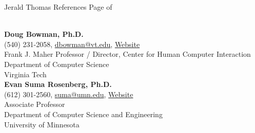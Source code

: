 



\newpage

\setcounter{page}{1}
\makecvfooter
  {Jerald Thomas}
  {References}
  {Page \thepage \hspace{1pt} of \pageref{references_last}}


\makecvheader[C]
\singlespacing

\\

\textbf{Doug Bowman, Ph.D.}\\
\hspace*{0.25cm}\faPhone\hspace*{0.1cm}(540) 231-2058,\hspace*{0.2cm} \faEnvelopeO\hspace*{0.1cm}\href{mailto://dbowman@vt.edu}{dbowman@vt.edu}, \faLink\hspace*{0.1cm}\href{https://people.cs.vt.edu/~bowman/}{Website}\\
\hspace*{0.25cm} Frank J. Maher Professor / Director, Center for Human Computer Interaction\\
\hspace*{0.25cm} Department of Computer Science\\
\hspace*{0.25cm} Virginia Tech\\

\textbf{Evan Suma Rosenberg, Ph.D.}\\
\hspace*{0.25cm}\faPhone\hspace*{0.1cm}(612) 301-2560,\hspace*{0.2cm} \faEnvelopeO\hspace*{0.1cm}\href{mailto://suma@umn.edu}{suma@umn.edu}, \faLink\hspace*{0.1cm}\href{https://illusioneering.umn.edu}{Website}\\
\hspace*{0.25cm} Associate Professor\\
\hspace*{0.25cm} Department of Computer Science and Engineering\\
\hspace*{0.25cm} University of Minnesota\\

